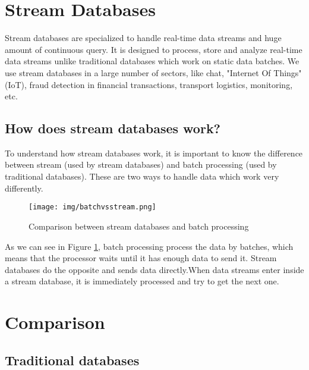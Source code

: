 \documentclass[utf8,9pt]{extarticle}
\begin{document}
\section{Stream Databases}
\indent \hspace{2mm} Stream databases are specialized to handle real-time data streams and huge amount of continuous query. It is designed to process, store and analyze real-time data streams unlike traditional databases which work on static data batches. We use stream databases in a large number of sectors, like chat, "Internet Of Things" (IoT), fraud detection in financial transactions, transport logistics, monitoring, etc.

\subsection{How does stream databases work?}

\indent \hspace{2mm} To understand how stream databases work, it is important to know the difference between stream (used by stream databases) and batch processing (used by traditional databases).
These are two ways to handle data which work very differently.

\begin{figure}[H]
    \centering
    \texttt{[image: img/batchvsstream.png]}
    \caption{Comparison between stream databases and batch processing}
    \label{fig:stream-batch}
\end{figure}

\indent \hspace{2mm} As we can see in Figure \ref{fig:stream-batch}, batch processing process the data by batches, which means that the processor waits until it has enough data to send it.
Stream databases do the opposite and sends data directly.When data streams enter inside a stream database, it is immediately processed and try to get the next one.

\section{Comparison}
\subsection{Traditional databases}
\end{document}
